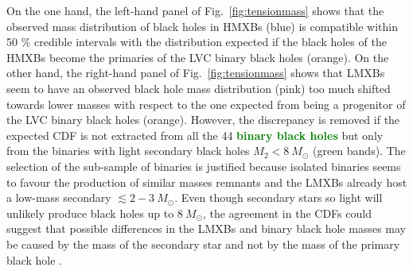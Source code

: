 \documentclass[a4paper,titlepage]{book}     	%
\newcommand{\sun}{\ensuremath{_\odot}}
\newcommand{\msun}{\ensuremath{M\sun}}
\newcommand{\erika}[1]{\textcolor{green}{\bf#1}}
\begin{document}
On the one hand, the left-hand panel of Fig.\ \ref{fig:tensionmass} shows that the observed mass distribution of black holes in HMXBs (blue) is compatible within 50 \% credible intervals with the distribution expected if the black holes of the HMXBs become the primaries of the LVC binary black holes (orange). On the other hand, the right-hand panel of Fig.\ \ref{fig:tensionmass} shows that LMXBs seem to have an observed black hole mass distribution (pink) too much shifted towards lower masses with respect to the one expected from being a progenitor of the LVC binary black holes (orange). However, the discrepancy is removed if the expected CDF is not extracted from all the 44 \erika{binary black holes} but only from the binaries with light secondary black holes $M_2 < 8~\msun$ (green bands). The selection of the sub-sample of binaries is justified because isolated binaries seems to favour the production of similar masses remnants and the LMXBs already host a low-mass secondary $\lesssim 2-3~\msun$. Even though secondary stars so light will unlikely produce black holes up to $8~\msun$, the agreement in the CDFs could suggest that possible differences in the LMXBs and binary black hole masses may be caused by the mass of the secondary star and not by the mass of the primary black hole \cite{HMXBH_spins2021}.
\end{document}
